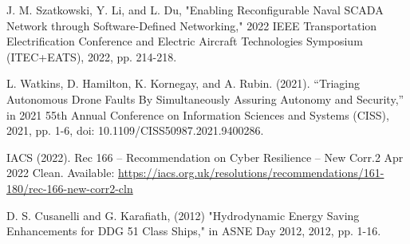 \documentclass[conference]{IEEEtran}
\begin{document}
\begin{thebibliography}{00}
 J. M. Szatkowski, Y. Li, and L. Du, "Enabling Reconfigurable Naval SCADA Network through Software-Defined Networking," 2022 IEEE Transportation Electrification Conference and Electric Aircraft Technologies Symposium (ITEC+EATS), 2022, pp. 214-218.

 L. Watkins, D. Hamilton, K. Kornegay, and A. Rubin. (2021). ``Triaging Autonomous Drone Faults By Simultaneously Assuring Autonomy and Security,'' in 2021 55th Annual Conference on Information Sciences and Systems (CISS), 2021, pp. 1-6, doi: 10.1109/CISS50987.2021.9400286.

 IACS (2022). Rec 166 – Recommendation on Cyber Resilience – New Corr.2 Apr 2022 Clean. Available: \url{https://iacs.org.uk/resolutions/recommendations/161-180/rec-166-new-corr2-cln}

 D. S. Cusanelli and G. Karafiath, (2012) "Hydrodynamic Energy Saving Enhancements for DDG 51 Class Ships," in ASNE Day 2012, 2012, pp. 1-16.
\end{thebibliography}
\vspace{12pt}
\end{document}
